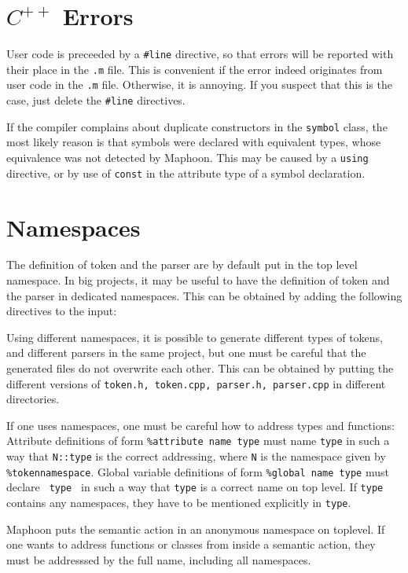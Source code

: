 \documentclass{article}
\begin{document}
\section{ $ C^{++} $ Errors}

User code is preceeded by a \verb+#line+ directive,
so that errors will be reported with their place in
the \verb+.m+ file. This is convenient if the error
indeed originates from user code in the \verb+.m+ file.
Otherwise, it is annoying. If you suspect that
this is the case, just
delete the \verb+#line+ directives. 

If the compiler complains about duplicate constructors in
the \verb+symbol+ class, the most likely reason is that
symbols were declared with equivalent types, whose
equivalence was not detected by Maphoon. 
This may be caused by a \verb+using+ directive,
or by use of \verb+const+ in the attribute type of a symbol declaration.

\section{Namespaces}
\label{Sect_namespace}

\noindent
The definition of token and the parser are by default put 
in the top level namespace.
In big projects, it may be useful to have the definition of
token and the parser in dedicated namespaces. This can be 
obtained by adding the following directives to the input:

\noindent
Using different namespaces, it is possible to generate different
types of tokens, and different parsers in the same project,
but one must be careful that the generated files do not
overwrite each other.
This can be obtained by putting the different versions of 
\verb+token.h, token.cpp, parser.h, parser.cpp+ in
different directories. 

If one uses namespaces, one must be careful how to address 
types and functions:
Attribute definitions of form \verb+%attribute name type+ must
name \verb+type+ in such a way that \verb+N::type+ is the correct
addressing, where \verb+N+ is the namespace given
by \verb+%tokennamespace+. 
Global variable definitions of form \verb+%global name type+ must
declare \verb+ type + in such a way that \verb+type+ is a correct
name on top level. If \verb+type+ contains any namespaces,
they have to be mentioned explicitly in \verb+type+. 

Maphoon puts the semantic action in an anonymous namespace on
toplevel. If one wants to address functions or classes from inside
a semantic action, they must be addresssed by the full name,
including all namespaces. 
\end{document}
